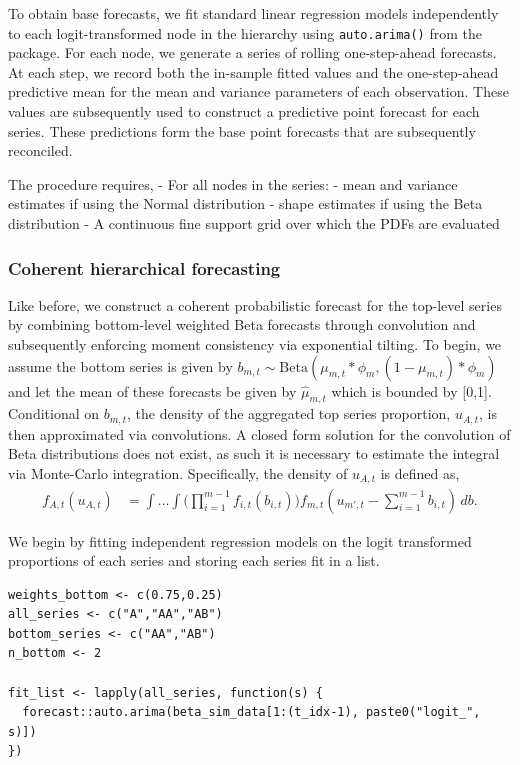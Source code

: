 To obtain base forecasts, we fit standard linear regression models independently to each logit-transformed node in the hierarchy using \texttt{auto.arima()} from the  package. For each node, we generate a series of rolling one-step-ahead forecasts. At each step, we record both the in-sample fitted values and the one-step-ahead predictive mean for the mean and variance parameters of each observation. These values are subsequently used to construct a predictive point forecast for each series. These predictions form the base point forecasts that are subsequently reconciled.

The procedure requires,
- For all nodes in the series:
- mean and variance estimates if using the Normal distribution
- shape estimates if using the Beta distribution
- A continuous fine support grid over which the PDFs are evaluated

\subsubsection{Coherent hierarchical forecasting}\label{coherent-hierarchical-forecasting-1}

Like before, we construct a coherent probabilistic forecast for the top-level series by combining bottom-level weighted Beta forecasts through convolution and subsequently enforcing moment consistency via exponential tilting. To begin, we assume the bottom series is given by \(b_{m, t} \sim \mathrm{Beta}(\mu_{m,t}*\phi_{m}, (1 - \mu_{m,t})*\phi_{m})\) and let the mean of these forecasts be given by \(\hat{\mu}_{m,t}\) which is bounded by {[}0,1{]}. Conditional on \(b_{m,t}\), the density of the aggregated top series proportion, \(u_{A,t}\), is then approximated via convolutions. A closed form solution for the convolution of Beta distributions does not exist, as such it is necessary to estimate the integral via Monte-Carlo integration. Specifically, the density of \(u_{A,t}\) is defined as,
\begin{align}
f_{A,t}(u_{A,t})
  &= \int \dots \int
    \bigg( \prod_{i=1}^{m-1} f_{i,t}(b_{i,t})   \bigg ) 
     f_{m,t}( u_{m',t} - \sum_{i=1}^{m-1} b_{i,t}) \, db.
\end{align}

We begin by fitting independent regression models on the logit transformed proportions of each series and storing each series fit in a list.

\begin{verbatim}
weights_bottom <- c(0.75,0.25)
all_series <- c("A","AA","AB")
bottom_series <- c("AA","AB")
n_bottom <- 2

fit_list <- lapply(all_series, function(s) {
  forecast::auto.arima(beta_sim_data[1:(t_idx-1), paste0("logit_", s)])
})
\end{verbatim}

